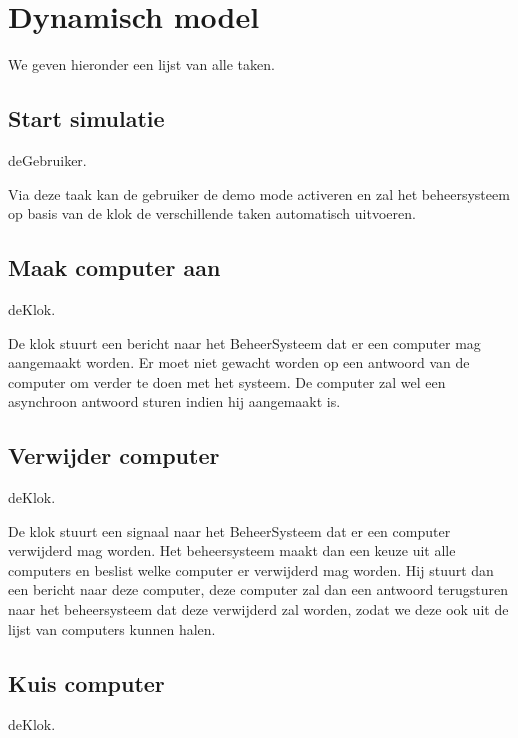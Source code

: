 \documentclass[a4paper,oneside]{report}
\begin{document}
\eindlemma
{}
\newpage
{}
\newpage
\section{Dynamisch model}
We geven hieronder een lijst van alle taken.
%
%

\newpage
\subsection{Start simulatie}
deGebruiker.

Via deze taak kan de gebruiker de demo mode activeren en zal het beheersysteem op basis van de klok de verschillende taken automatisch uitvoeren.


\newpage
\subsection{Maak computer aan}
deKlok.

De klok stuurt een bericht naar het BeheerSysteem dat er een computer mag aangemaakt worden. Er moet niet gewacht worden op een antwoord van de computer om verder te doen met het systeem. De computer zal wel een asynchroon antwoord sturen indien hij aangemaakt is.


\newpage
\subsection{Verwijder computer}
deKlok.

De klok stuurt een signaal naar het BeheerSysteem dat er een computer verwijderd mag worden. Het beheersysteem maakt dan een keuze uit alle computers en beslist welke computer er verwijderd mag worden. Hij stuurt dan een bericht naar deze computer, deze computer zal dan een antwoord terugsturen naar het beheersysteem dat deze verwijderd zal worden, zodat we deze ook uit de lijst van computers kunnen halen.


\newpage
\subsection{Kuis computer}
deKlok.
\end{document}
